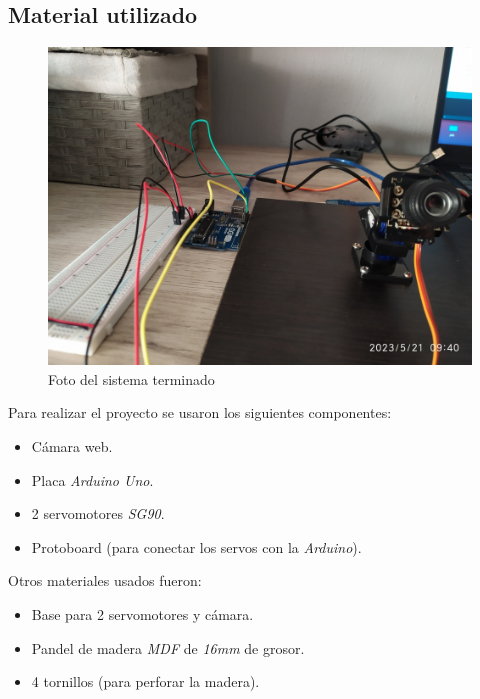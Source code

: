 \documentclass[12pt, oneside]{article}
\begin{document}
\subsection{Material utilizado}
{\sffamily\large\justify
    \begin{figure}[h!]
        \centering
        \includegraphics[width=0.8\linewidth]{figs/IMG_20230521_094011.jpg}
        \caption{\sffamily Foto del sistema terminado}
        \label{fig:elProyecto}
    \end{figure}

    \hspace{0.5cm} Para realizar el proyecto se usaron los siguientes componentes:
    \renewcommand{\labelitemi}{$\bullet$}
    \begin{itemize}
        \item Cámara web.
        \item Placa \emph{Arduino Uno}.
        \item 2 servomotores \emph{SG90}.
        \item Protoboard (para conectar los servos con la \emph{Arduino}).
    \end{itemize}

    \hspace{0.5cm} Otros materiales usados fueron:
    \begin{itemize}
        \item Base para 2 servomotores y cámara.
        \item Pandel de madera \emph{MDF} de \emph{16mm} de grosor.
        \item 4 tornillos (para perforar la madera).
    \end{itemize}

}

\newpage
\end{document}
